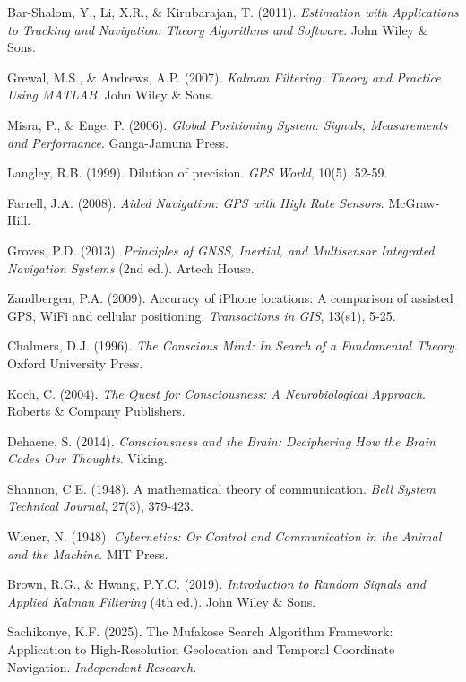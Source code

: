 \documentclass[12pt,a4paper]{article}
\begin{document}
\begin{thebibliography}{99}
Bar-Shalom, Y., Li, X.R., \& Kirubarajan, T. (2011). \textit{Estimation with Applications to Tracking and Navigation: Theory Algorithms and Software}. John Wiley \& Sons.

Grewal, M.S., \& Andrews, A.P. (2007). \textit{Kalman Filtering: Theory and Practice Using MATLAB}. John Wiley \& Sons.

Misra, P., \& Enge, P. (2006). \textit{Global Positioning System: Signals, Measurements and Performance}. Ganga-Jamuna Press.

Langley, R.B. (1999). Dilution of precision. \textit{GPS World}, 10(5), 52-59.

Farrell, J.A. (2008). \textit{Aided Navigation: GPS with High Rate Sensors}. McGraw-Hill.

Groves, P.D. (2013). \textit{Principles of GNSS, Inertial, and Multisensor Integrated Navigation Systems} (2nd ed.). Artech House.

Zandbergen, P.A. (2009). Accuracy of iPhone locations: A comparison of assisted GPS, WiFi and cellular positioning. \textit{Transactions in GIS}, 13(s1), 5-25.

Chalmers, D.J. (1996). \textit{The Conscious Mind: In Search of a Fundamental Theory}. Oxford University Press.

Koch, C. (2004). \textit{The Quest for Consciousness: A Neurobiological Approach}. Roberts \& Company Publishers.

Dehaene, S. (2014). \textit{Consciousness and the Brain: Deciphering How the Brain Codes Our Thoughts}. Viking.

Shannon, C.E. (1948). A mathematical theory of communication. \textit{Bell System Technical Journal}, 27(3), 379-423.

Wiener, N. (1948). \textit{Cybernetics: Or Control and Communication in the Animal and the Machine}. MIT Press.

Brown, R.G., \& Hwang, P.Y.C. (2019). \textit{Introduction to Random Signals and Applied Kalman Filtering} (4th ed.). John Wiley \& Sons.

Sachikonye, K.F. (2025). The Mufakose Search Algorithm Framework: Application to High-Resolution Geolocation and Temporal Coordinate Navigation. \textit{Independent Research}.


\end{thebibliography}
\end{document}
